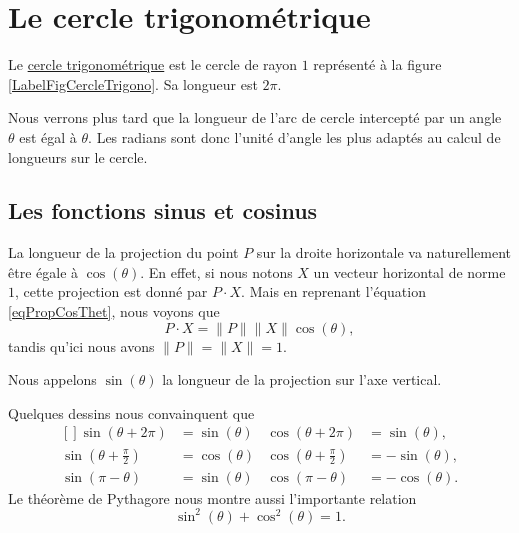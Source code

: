 
\section{Le cercle trigonométrique}

Le \href{http://fr.wikiversity.org/wiki/Trigonométrie/Cosinus_et_sinus_dans_le_cercle_trigonométrique}{cercle trigonométrique} est le cercle de rayon $1$ représenté à la figure \ref{LabelFigCercleTrigono}. Sa longueur est $2\pi$.
\newcommand{\CaptionFigCercleTrigono}{Le cercle trigonométrique.}


Nous verrons plus tard que la longueur de l'arc de cercle intercepté par un angle $\theta$ est égal à $\theta$. Les radians sont donc l'unité d'angle les plus adaptés au calcul de longueurs sur le cercle. 


\subsection{Les fonctions sinus et cosinus}

La longueur de la projection du point $P$ sur la droite horizontale va naturellement être égale à $\cos(\theta)$. En effet, si nous notons $X$ un vecteur horizontal de norme $1$, cette projection est donné par $P\cdot X$. Mais en reprenant l'équation \eqref{eqPropCosThet}, nous voyons que
\begin{equation}
	P\cdot X=\| P \|\| X \|\cos(\theta),
\end{equation}
tandis qu'ici nous avons $\| P \|=\| X \|=1$.

Nous appelons $\sin(\theta)$ la longueur de la projection sur l'axe vertical.

Quelques dessins nous convainquent que 
\begin{equation}
	\begin{aligned}[]
		\sin(\theta+2\pi)&=\sin(\theta)&\cos(\theta+2\pi)&=\sin(\theta),\\
		\sin(\theta+\frac{ \pi }{2})&=\cos(\theta)&\cos(\theta+\frac{ \pi }{2})&=-\sin(\theta),\\
		\sin(\pi-\theta)&=\sin(\theta)&\cos(\pi-\theta)&=-\cos(\theta).
	\end{aligned}
\end{equation}
Le théorème de Pythagore nous montre aussi l'importante relation
\begin{equation}
	\sin^2(\theta)+\cos^2(\theta)=1.
\end{equation}

